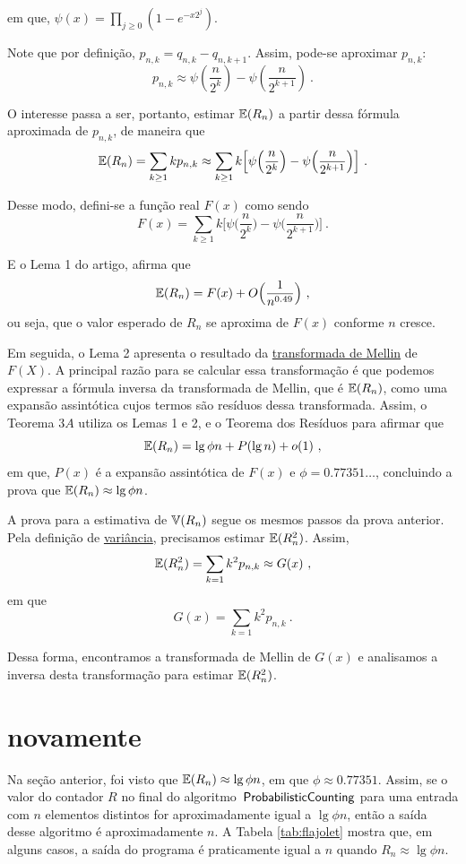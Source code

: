 em que, $\psi(x) = \prod_{j \geq 0} (1 - e^{-x2^j})$.

Note que por definição, $p_{n,k} = q_{n,k} - q_{n,k+1}$. Assim, pode-se aproximar $p_{n,k}$:
\[ p_{n,k} \approx \psi(\frac{n}{2^k}) - \psi(\frac{n}{2^{k+1}}) \ . \]

O interesse passa a ser, portanto, estimar $\mathbb{E}(R_n)$ a partir dessa fórmula aproximada de $p_{n,k}$, de maneira 
que 
\[ \mathbb{E}(R_n) = \sum_{k \geq 1} k p_{n,k} \approx \sum_{k \geq 1} k \Big[ \psi \Big( \frac{n}{2^k} \Big) - \psi 
  \Big( \frac{n}{2^{k+1}} \Big) \Big] \ . \]

Desse modo, defini-se a função real $F(x)$ como sendo
\[ F(x) =  \sum_{k \geq 1} k \Big[ \psi \Big( \frac{n}{2^k} \Big) - \psi \Big( \frac{n}{2^{k+1}} \Big) \Big] \ . \]

E o Lema 1 do artigo, afirma que 
\[ \mathbb{E}(R_n) = F(x) + O \Big( \frac{1}{n^{0.49}} \Big) \ , \]
ou seja, que o valor esperado de $R_n$ se aproxima de $F(x)$ conforme $n$ cresce.

Em seguida, o Lema 2 apresenta o resultado da \hyperref[ap:mellin]{transformada de Mellin} de $F(X)$. A principal razão 
para se calcular essa transformação é que podemos expressar a fórmula inversa da transformada de Mellin, que é 
$\mathbb{E}(R_n)$, como uma expansão assintótica cujos termos são resíduos dessa transformada. Assim, o Teorema $3A$ utiliza 
os Lemas 1 e 2, e o Teorema dos Resíduos para afirmar que 
\[ \Ebb(R_n) = \lg \phi n + P(\lg n) + o(1) \ , \]
em que, $P(x)$ é a expansão assintótica de $F(x)$ e $\phi = 0.77351{\dots}$, concluindo a prova que 
$\mathbb{E}(R_n) \approx \lg \phi n$.

A prova para a estimativa de $\mathbb{V}(R_n)$ segue os mesmos passos da prova anterior. Pela definição de 
\hyperref[ap:variance]{variância}, precisamos estimar $\mathbb{E}(R_n ^ 2)$. Assim, 
\[ \mathbb{E}(R_n ^ 2) = \sum_{k=1} k^2 p_{n,k} \approx G(x) \ , \]
em que
\[ G(x) = \sum_{k=1} k^2 p_{n,k} \ . \]

Dessa forma, encontramos a transformada de Mellin de $G(x)$ e analisamos a inversa desta transformação para estimar 
$\mathbb{E}(R_n^2)$.

\section{ novamente}

Na seção anterior, foi visto que $\mathbb{E}(R_n) \approx \lg \phi n$, em que $\phi \approx 0.77351$. Assim, se o valor 
do contador $R$ no final do algoritmo~$\textsf{ProbabilisticCounting}$ para uma entrada com $n$ elementos distintos for aproximadamente igual a 
$\lg \phi n$, então a saída desse algoritmo é aproximadamente $n$. A Tabela \ref{tab:flajolet} mostra que, em alguns 
casos, a saída do programa é praticamente igual a $n$ quando $R_n \approx \lg \phi n$.

